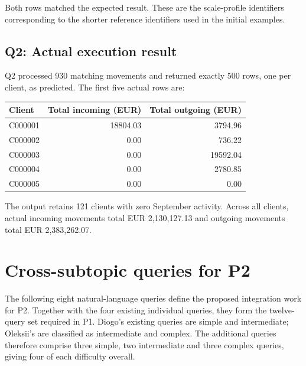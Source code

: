 \documentclass[11pt,a4paper]{article}
\begin{document}
Both rows matched the expected result. These are the scale-profile
identifiers corresponding to the shorter reference identifiers used in the
initial examples.

\subsection{Q2: Actual execution result}

Q2 processed 930 matching movements and returned exactly 500 rows, one per
client, as predicted. The first five actual rows are:

\begingroup
\renewcommand{\arraystretch}{1.2}
\begin{tabularx}{\textwidth}{@{}l r r@{}}
\toprule
Client & Total incoming (EUR) & Total outgoing (EUR)\\
\midrule
C000001 & 18804.03 & 3794.96\\
C000002 & 0.00 & 736.22\\
C000003 & 0.00 & 19592.04\\
C000004 & 0.00 & 2780.85\\
C000005 & 0.00 & 0.00\\
\bottomrule
\end{tabularx}
\endgroup

The output retains 121 clients with zero September activity. 
Across all clients, actual incoming
movements total EUR 2,130,127.13 and outgoing movements total
EUR 2,383,262.07.

\section{Cross-subtopic queries for P2}

The following eight natural-language queries define the proposed integration
work for P2. Together with the four existing individual queries, they form
the twelve-query set required in P1. Diogo's existing queries are simple and
intermediate; Oleksii's are classified as intermediate and complex.
The additional queries therefore comprise three simple, two intermediate
and three complex queries, giving four of each difficulty overall.
\end{document}
